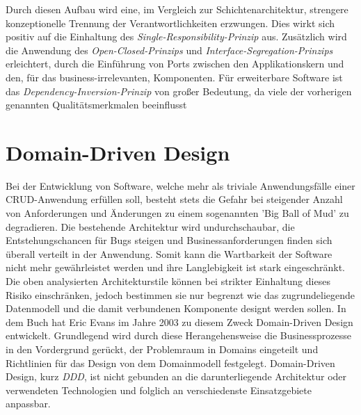 
Durch diesen Aufbau wird eine, im Vergleich zur Schichtenarchitektur, strengere konzeptionelle Trennung der Verantwortlichkeiten erzwungen. Dies wirkt sich positiv auf die Einhaltung des \emph{Single-Responsibility-Prinzip} aus. Zusätzlich wird die Anwendung des \emph{Open-Closed-Prinzips} und \emph{Interface-Segregation-Prinzips} erleichtert, durch die Einführung von Ports zwischen den Applikationskern und den, für das business-irrelevanten, Komponenten. Für erweiterbare Software ist das \emph{Dependency-Inversion-Prinzip} von großer Bedeutung, da viele der vorherigen genannten Qualitätsmerkmalen beeinflusst 





\section{Domain-Driven Design}

Bei der Entwicklung von Software, welche mehr als triviale Anwendungsfälle einer CRUD-Anwendung erfüllen soll, besteht stets die Gefahr bei steigender Anzahl von Anforderungen und Änderungen zu einem sogenannten 'Big Ball of Mud' zu {\color{red} degradieren}. Die bestehende Architektur wird undurchschaubar, die Entstehungschancen für Bugs steigen und Businessanforderungen finden sich überall verteilt in der Anwendung. Somit kann die Wartbarkeit der Software nicht mehr gewährleistet werden und ihre Langlebigkeit ist stark eingeschränkt. Die oben analysierten Architekturstile können bei strikter Einhaltung dieses Risiko einschränken, jedoch bestimmen sie nur begrenzt wie das zugrundeliegende Datenmodell und die damit verbundenen Komponente designt werden sollen. In dem Buch  hat Eric Evans im Jahre 2003 zu diesem Zweck Domain-Driven Design entwickelt. Grundlegend wird durch diese Herangehensweise die Businessprozesse in den Vordergrund gerückt, der Problemraum in Domains eingeteilt und Richtlinien für das Design von dem Domainmodell festgelegt. Domain-Driven Design, kurz \emph{DDD}, ist nicht gebunden an die darunterliegende Architektur oder verwendeten Technologien und folglich an verschiedenste Einsatzgebiete anpassbar.

